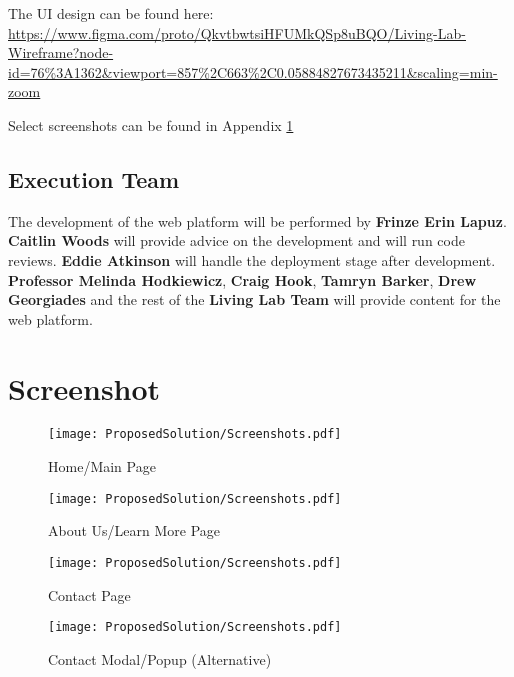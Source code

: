 \sloppy The UI design can be found here: \\ \url{https://www.figma.com/proto/QkvtbwtsiHFUMkQSp8uBQO/Living-Lab-Wireframe?node-id=76%3A1362&viewport=857%2C663%2C0.05884827673435211&scaling=min-zoom}

Select screenshots can be found in Appendix \ref{appendixa}

\subsection{Execution Team}
The development of the web platform will be performed by \textbf{Frinze Erin Lapuz}. \textbf{Caitlin Woods} will provide advice on the development and will run code reviews. \textbf{Eddie Atkinson} will handle the deployment stage after development. \textbf{Professor Melinda Hodkiewicz}, \textbf{Craig Hook}, \textbf{Tamryn Barker}, \textbf{Drew Georgiades} and the rest of the \textbf{Living Lab Team} will provide content for the web platform.

\pagebreak

\appendix
\section {Screenshot} \label{appendixa}

\begin{figure}[H]
    \centering
    \begin{minipage}{0.45\textwidth}
        \centering
        \texttt{[image: ProposedSolution/Screenshots.pdf]} 
        \caption{Home/Main Page}
    \end{minipage}\hfill
    \begin{minipage}{0.45\textwidth}
        \centering
        \texttt{[image: ProposedSolution/Screenshots.pdf]} 
        \caption{About Us/Learn More Page}
    \end{minipage}
    \centering
    \begin{minipage}{0.45\textwidth}
        \centering
        \texttt{[image: ProposedSolution/Screenshots.pdf]} 
        \caption{Contact Page}
    \end{minipage}\hfill
    \begin{minipage}{0.45\textwidth}
        \centering
        \texttt{[image: ProposedSolution/Screenshots.pdf]} 
        \caption{Contact Modal/Popup (Alternative)}
    \end{minipage}
\end{figure}

